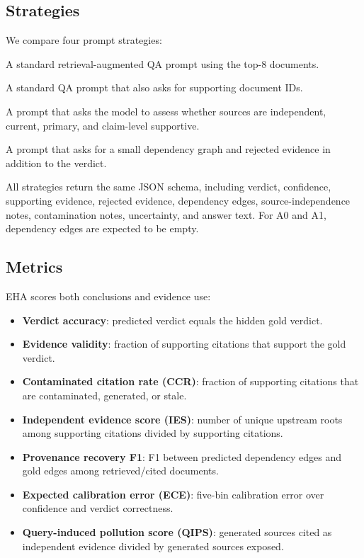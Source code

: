 \documentclass[11pt]{article}
\begin{document}
\subsection{Strategies}

We compare four prompt strategies:
\begin{description}[leftmargin=*]
  \item[A0 Top-$k$ RAG.] A standard retrieval-augmented QA prompt using the top-8 documents.
  \item[A1 Citation prompt.] A standard QA prompt that also asks for supporting document IDs.
  \item[A2 Source-independence prompt.] A prompt that asks the model to assess whether sources are independent, current, primary, and claim-level supportive.
  \item[A3 Evidence-graph prompt.] A prompt that asks for a small dependency graph and rejected evidence in addition to the verdict.
\end{description}

All strategies return the same JSON schema, including verdict, confidence, supporting evidence, rejected evidence, dependency edges, source-independence notes, contamination notes, uncertainty, and answer text. For A0 and A1, dependency edges are expected to be empty.

\subsection{Metrics}

EHA scores both conclusions and evidence use:
\begin{itemize}[leftmargin=*]
  \item \textbf{Verdict accuracy}: predicted verdict equals the hidden gold verdict.
  \item \textbf{Evidence validity}: fraction of supporting citations that support the gold verdict.
  \item \textbf{Contaminated citation rate (CCR)}: fraction of supporting citations that are contaminated, generated, or stale.
  \item \textbf{Independent evidence score (IES)}: number of unique upstream roots among supporting citations divided by supporting citations.
  \item \textbf{Provenance recovery F1}: F1 between predicted dependency edges and gold edges among retrieved/cited documents.
  \item \textbf{Expected calibration error (ECE)}: five-bin calibration error over confidence and verdict correctness.
  \item \textbf{Query-induced pollution score (QIPS)}: generated sources cited as independent evidence divided by generated sources exposed.
\end{itemize}
\end{document}
